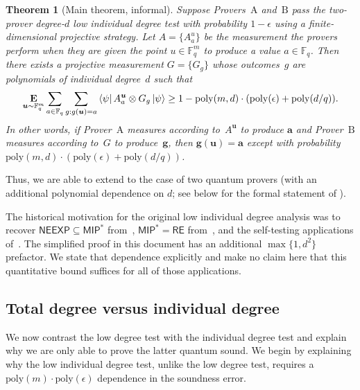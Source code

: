 \documentclass[11pt]{article}
\newtheorem{theorem}{Theorem}[section]
\theoremstyle{definition}
\newcommand{\E}{\mathop{\bf E\/}}
\newcommand{\poly}{\mathrm{poly}}
\newcommand{\F}{\mathbb F}
\newcommand{\NEEXP}{\mathsf{NEEXP}}
\newcommand{\MIP}{\mathsf{MIP}}
\newcommand{\eps}{\epsilon}
\newcommand{\ot}{\otimes}
\newcommand{\ba}{\boldsymbol{a}}
\newcommand{\bg}{\boldsymbol{g}}
\newcommand{\bu}{\boldsymbol{u}}
\begin{document}
\begin{theorem}[Main theorem, informal]\label{thm:main-informal}
Suppose Provers~$\mathrm{A}$ and~$\mathrm{B}$
pass the two-prover degree-$d$ low individual degree test with probability $1-\eps$
using a finite-dimensional projective strategy.
Let $A = \{A^u_a\}$ be the measurement the provers perform when they are given the point $u \in \F_q^m$
to produce a value $a \in \F_q$.
Then there exists a projective measurement $G = \{G_g\}$
whose outcomes~$g$ are polynomials of individual degree~$d$
such that
\begin{equation*}
\E_{\bu \sim \F_q^m}\sum_{a \in \F_q} \sum_{g:g(\bu) = a} \bra{\psi} A^{\bu}_{a} \ot G_g \ket{\psi}
\geq 1 - \poly(m,d) \cdot (\poly(\eps) + \poly(d/q)).
\end{equation*}
In other words, if Prover~$\mathrm{A}$ measures according to~$A^{\bu}$ to produce $\ba$ and Prover~$\mathrm{B}$ measures according to~$G$ to produce~$\bg$,
then $\bg(\bu) = \ba$ except with probability $\poly(m,d) \cdot (\poly(\eps) + \poly(d/q))$.
\end{theorem}
\noindent
Thus, we are able to extend 
to the case of two quantum provers (with an additional polynomial dependence on $d$; see  below for the formal statement of ).

The historical motivation for the original low individual degree
analysis was to recover $\NEEXP\subseteq\MIP^*$ from~\cite{NW19},
$\MIP^*=\mathsf{RE}$ from~\cite{JNV+20}, and the self-testing
applications of~\cite{NV18a}.  The simplified proof in this document
has an additional $\max\{1,d^2\}$ prefactor.  We state that dependence
explicitly and make no claim here that this quantitative bound
suffices for all of those applications.

\subsection{Total degree versus individual degree}

We now contrast the low degree test with the individual degree test
and explain why we are only able to prove the latter quantum sound.
We begin by explaining why the low individual degree test,
unlike the low degree test,
requires a $\poly(m) \cdot \poly(\eps)$ dependence in the soundness error.
\end{document}
